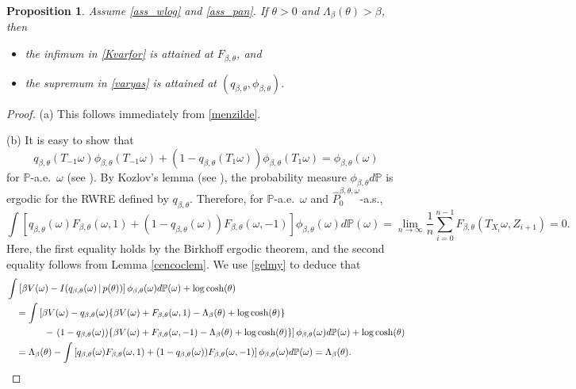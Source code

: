 \documentclass[a4paper]{amsart}
\numberwithin{equation}{section}
\theoremstyle{plain}
\newtheorem{proposition}[theorem]{\sc Proposition}
\theoremstyle{remark}
\begin{document}
\begin{proposition}
	Assume \eqref{ass_wlog} and \eqref{ass_pan}. If $\theta>0$ and $\Lambda_\beta(\theta) > \beta$, then
	\begin{itemize}
		\item [(a)] the infimum in \eqref{Kvarfor} is attained at $F_{\beta,\theta}$, and
		\item [(b)] the supremum in \eqref{varyas} is attained at $(q_{\beta,\theta},\phi_{\beta,\theta})$.
	\end{itemize}
\end{proposition}

\begin{proof}
	(a) This follows immediately from \eqref{menzilde}.
	
	(b) It is easy to show that $$q_{\beta,\theta}(T_{-1}\omega)\phi_{\beta,\theta}(T_{-1}\omega) + (1 - q_{\beta,\theta}(T_1\omega))\phi_{\beta,\theta}(T_1\omega) = \phi_{\beta,\theta}(\omega)$$
	for $\mathbb{P}$-a.e.\ $\omega$ (see \cite[Theorem 5.17]{Yil2009}). By Kozlov's lemma (see \cite{Koz1985}), the probability measure $\phi_{\beta,\theta}d\mathbb{P}$ is ergodic for the RWRE defined by $q_{\beta,\theta}$. Therefore, for $\mathbb{P}$-a.e.\ $\omega$ and $\hat P_0^{\beta,\theta,\omega}$-a.s.,
	\begin{equation}\label{gelmy}
	\int \left[q_{\beta,\theta}(\omega)F_{\beta,\theta}(\omega,1) + (1 - q_{\beta,\theta}(\omega))F_{\beta,\theta}(\omega,-1)\right]\phi_{\beta,\theta}(\omega)d\mathbb{P}(\omega) = \lim_{n\to\infty}\frac1{n}\sum_{i=0}^{n-1}F_{\beta,\theta}(T_{X_i}\omega,Z_{i+1}) = 0.
	\end{equation}
	Here, the first equality holds by the Birkhoff ergodic theorem, and the second equality follows from Lemma \ref{cencoclem}. We use \eqref{gelmy} to deduce that
	\begin{align*}
	&\int \left[\beta V(\omega) - I(q_{\beta,\theta}(\omega)\,|\,p(\theta))\right]\phi_{\beta,\theta}(\omega)d\mathbb{P}(\omega) + \log\cosh(\theta)\\
	&\quad = \int \left[\beta V(\omega) - q_{\beta,\theta}(\omega)\{\beta V(\omega) + F_{\beta,\theta}(\omega,1) - \Lambda_\beta(\theta) + \log\cosh(\theta)\}\right.\\
	&\qquad \qquad - \left.(1 - q_{\beta,\theta}(\omega))\{\beta V(\omega) + F_{\beta,\theta}(\omega,-1) - \Lambda_\beta(\theta) + \log\cosh(\theta)\}\right]\phi_{\beta,\theta}(\omega)d\mathbb{P}(\omega) + \log\cosh(\theta)\\
	&\quad = \Lambda_\beta(\theta) - \int \left[q_{\beta,\theta}(\omega)F_{\beta,\theta}(\omega,1) + (1 - q_{\beta,\theta}(\omega))F_{\beta,\theta}(\omega,-1)\right]\phi_{\beta,\theta}(\omega)d\mathbb{P}(\omega) = \Lambda_\beta(\theta).\qedhere
	\end{align*}
\end{proof}
\end{document}
